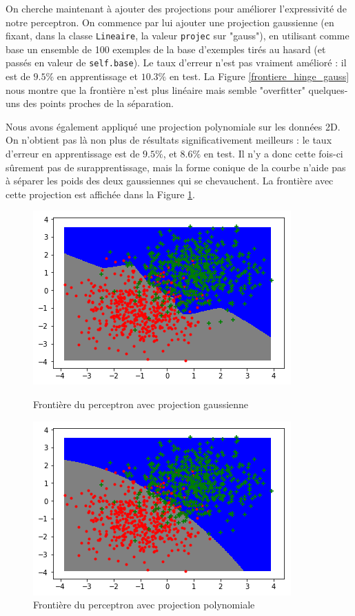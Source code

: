 \documentclass[a4paper]{article}
\begin{document}
On cherche maintenant à ajouter des projections pour améliorer l'expressivité de notre perceptron. On commence par lui ajouter une projection gaussienne (en fixant, dans la classe \verb!Lineaire!, la valeur \verb!projec! sur "gauss"), en utilisant comme base un ensemble de 100 exemples de la base d'exemples tirés au hasard (et passés en valeur de \verb!self.base!). Le taux d'erreur n'est pas vraiment amélioré : il est de $9.5\%$ en apprentissage et $10.3\%$ en test. La Figure \ref{frontiere_hinge_gauss} nous montre que la frontière n'est plus linéaire mais semble "overfitter" quelques-uns des points proches de la séparation.

Nous avons également appliqué une projection polynomiale sur les données 2D. On n'obtient pas là non plus de résultats significativement meilleurs : le taux d'erreur en apprentissage est de $9.5\%$, et $8.6\%$ en test. Il n'y a donc cette fois-ci sûrement pas de surapprentissage, mais la forme conique de la courbe n'aide pas à séparer les poids des deux gaussiennes qui se chevauchent. La frontière avec cette projection est affichée dans la Figure \ref{frontiere_hinge_poly}.

\begin{figure}[ht!]
\begin{center}
\begin{minipage}{0.45\textwidth}
\includegraphics[scale=0.5]{frontiere_hinge_gauss.png}
\caption{Frontière du perceptron avec projection gaussienne}
\label{frontiere_hinge_gauss}
\end{minipage}\hfill
\begin{minipage}{0.45\textwidth}
\includegraphics[scale=0.5]{frontiere_hinge_poly.png}
\caption{Frontière du perceptron avec projection polynomiale}
\label{frontiere_hinge_poly}
\end{minipage}
\end{center}
\end{figure}
\end{document}
